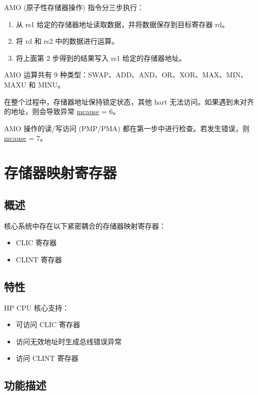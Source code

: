 \documentclass[main\_\_CN.tex]{subfiles}
\begin{document}
AMO (原子性存储器操作) 指令分三步执行：

\begin{enumerate}
    \item 从 rs1 给定的存储器地址读取数据，并将数据保存到目标寄存器 rd。
    \item 将 rd 和 rs2 中的数据进行运算。
    \item 将上面第 2 步得到的结果写入 rs1 给定的存储器地址。
\end{enumerate}

AMO 运算共有 9 种类型：SWAP、ADD、AND、OR、XOR、MAX、MIN、MAXU 和 MINU。

在整个过程中，存储器地址保持锁定状态，其他 hart 无法访问。如果遇到未对齐的地址，则会导致异常 \hyperref[regdesc:MCAUSE]{mcause} = 6。

AMO 操作的读/写访问 (PMP/PMA) 都在第一步中进行检查。若发生错误，则 \hyperref[regdesc:MCAUSE]{mcause} = 7。

\newpage
\section{存储器映射寄存器}
\label{sec:riscvcpu-tcip}

\subsection{概述}
\label{sec:riscvcpu-tcip-overview}

核心系统中存在以下紧密耦合的存储器映射寄存器：

\begin{itemize}
    \item CLIC 寄存器
    \item CLINT 寄存器
\end{itemize}

\subsection{特性}
\label{sec:riscvcpu-tcip-features}

HP CPU 核心支持：
\begin{itemize}
    \item 可访问 CLIC 寄存器
    \item 访问无效地址时生成总线错误异常
    \item 访问 CLINT 寄存器
\end{itemize}

\subsection{功能描述}
\label{sec:riscvcpu-tcip-func-descr}
\end{document}
